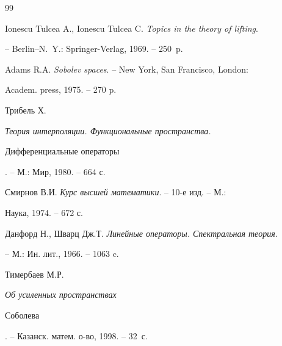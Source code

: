 \begin{thebibliography}{99}


Ionescu Tulcea A., Ionescu Tulcea C. {\em Topics in the theory of lifting}.


-- Berlin--N.~Y.: Springer-Verlag, 1969. -- 250~p.







Adams R.A. {\em Sobolev spaces}. -- New York, San Francisco, London:


Academ. press, 1975. -- 270 p.







Трибель Х. {\em Теория интерполяции. Функциональные пространства.


Дифференциальные операторы}. -- М.: Мир, 1980. -- 664 с.







Смирнов В.И. {\em Курс высшей математики}. -- 10-е изд. -- М.:


Наука, 1974. -- 672 с.







Данфорд Н., Шварц Дж.Т. {\em Линейные операторы. Спектральная теория}.


-- М.: Ин. лит., 1966. -- 1063 c.







Тимербаев М.Р. {\em Об усиленных пространствах


Соболева}. -- Казанск. матем. о-во, 1998. -- 32~с.








\end{thebibliography}





\vskip 2cm












\label{end}








